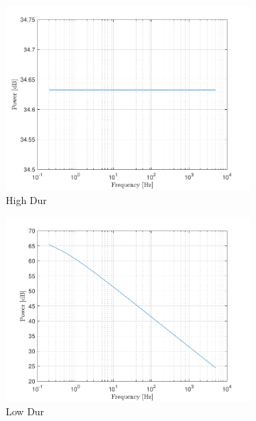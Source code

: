 \documentclass[10pt]{article}
\begin{document}
\begin{figure}[ht]
    \centering
    \begin{subfigure}[b]{0.31\textwidth}
        \includegraphics[width=\textwidth]{problem11_white_noise_power_spectrum_db.pdf}
        \caption{High Dur}
    \end{subfigure}
    \quad
    \begin{subfigure}[b]{0.31\textwidth}
        \includegraphics[width=\textwidth]{problem11_pink_noise_power_spectrum_db.pdf}
        \caption{Low Dur}
    \end{subfigure}
    \quad
    \begin{subfigure}[b]{0.31\textwidth}

\end{subfigure}
\end{figure}
\end{document}
